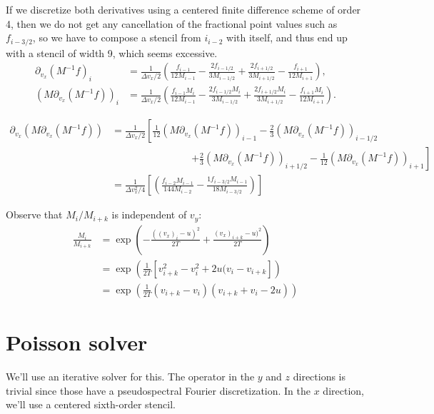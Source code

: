 \documentclass{article}
\begin{document}
If we discretize both derivatives using a centered finite difference scheme of order 4, then we do not get any cancellation of the fractional point values such as $f_{i-3/2}$, so
we have to compose a stencil from $i_{i-2}$ with itself, and thus end up with a stencil of width 9, which seems excessive.
\begin{align*}
    \partial_{v_x} (M^{-1} f)_i &= \frac{1}{\Delta v_x / 2} \left( \frac{f_{i-1}}{12 M_{i-1}} - \frac{2f_{i-1/2}}{3 M_{i-1/2}} + \frac{2f_{i+1/2}}{3 M_{i+1/2}} - \frac{f_{i+1}}{12 M_{i+1}} \right), \\
    (M \partial_{v_x} (M^{-1} f))_i &= \frac{1}{\Delta v_x / 2} \left( \frac{f_{i-1} M_i}{12 M_{i-1}} - \frac{2f_{i-1/2} M_i}{3 M_{i-1/2}} + \frac{2f_{i+1/2} M_i}{3 M_{i+1/2}} - \frac{f_{i+1} M_i}{12 M_{i+1}} \right).
\end{align*}

\begin{align*}
    \partial_{v_x} (M \partial_{v_x} (M^{-1} f)) &= \frac{1}{\Delta v_x / 2} \left[ \frac{1}{12} (M \partial_{v_x} (M^{-1} f))_{i-1} - \frac{2}{3} (M \partial_{v_x} (M^{-1} f))_{i-1/2} \right. \\
                                                 &\qquad\qquad\qquad\qquad  \left. +  \frac{2}{3} (M \partial_{v_x} (M^{-1} f))_{i+1/2} - \frac{1}{12} (M \partial_{v_x} (M^{-1} f))_{i+1} \right] \\
                                                 &= \frac{1}{\Delta v_x^2/4} \left[ \left( \frac{f_{i-2} M_{i-1}}{144 M_{i-2}} - \frac{1 f_{i-3/2} M_{i-1}}{18 M_{i-3/2}} \right)  \right] 
\end{align*}

Observe that $M_i / M_{i+k}$ is independent of $v_y$:
\begin{align*}
    \frac{M_i}{M_{i+k}} &= \exp \left( -\frac{((v_x)_i - u)^2}{2T} + \frac{(v_x)_{i+k} - u)^2}{2T} \right) \\
                        &= \exp \left( \frac{1}{2T} \left[ v_{i+k}^2 - v_i^2 + 2u(v_i - v_{i+k} \right]  \right)  \\
                        &= \exp \left( \frac{1}{2T} (v_{i+k} - v_i)(v_{i+k} + v_i - 2u)  \right) 
\end{align*}

\section{Poisson solver}
We'll use an iterative solver for this.
The operator in the $y$ and $z$ directions is trivial since those have a pseudospectral Fourier discretization.
In the $x$ direction, we'll use a centered sixth-order stencil.
\end{document}
